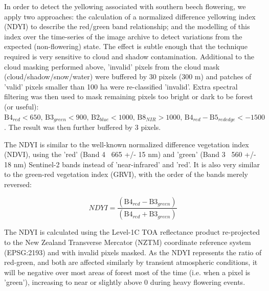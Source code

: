 \documentclass[remotesensing,article,submit,moreauthors,pdftex]{Definitions/mdpi}
\begin{document}
In order to detect the yellowing associated with southern beech flowering, we apply two approaches: the calculation of a normalized difference yellowing index (NDYI) to describe the red/green band relationship; and the modelling of this index over the time-series of the image archive to detect variations from the expected (non-flowering) state. The effect is subtle enough that the technique required is very sensitive to cloud and shadow contamination. Additional to the cloud masking performed above, 'invalid' pixels from the cloud mask (cloud/shadow/snow/water) were buffered by 30 pixels (300 m) and patches of 'valid' pixels smaller than 100 ha were re-classified 'invalid'. Extra spectral filtering was then used to mask remaining pixels too bright or dark to be forest (or useful): $\text{B}4_{red} < 650\text{, B}3_{green} < 900\text{, B}2_{blue} < 1000\text{, B}8_{NIR} > 1000\text{, B}4_{red} - \text{B}5_{red edge} < -1500$. The result was then further buffered by 3 pixels.

The NDYI is similar to the well-known normalized difference vegetation index (NDVI)\citep{Rouse1974}, using the 'red' (Band 4 ~665 +/- 15 nm) and 'green' (Band 3 ~560 +/- 18 nm) Sentinel-2 bands instead of 'near-infrared' and 'red'. It is also very similar to the green-red vegetation index (GRVI)\citep{Tucker1979,Motohka2010}, with the order of the bands merely reversed:

\begin{equation}
    NDYI = \frac{(\text{B4}_{red} - \text{B3}_{green})}{(\text{B4}_{red} + \text{B3}_{green})}
\end{equation}

The NDYI is calculated using the Level-1C TOA reflectance product re-projected to the New Zealand Transverse Mercator (NZTM) coordinate reference system (EPSG:2193) and with invalid pixels masked. As the NDYI represents the ratio of red-green, and both are affected similarly by transient atmospheric conditions, it will be negative over most areas of forest most of the time (i.e. when a pixel is 'green'), increasing to near or slightly above 0 during heavy flowering events. 
\end{document}
